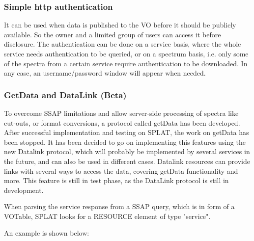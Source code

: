 \documentclass[final,authoryear,5p,times,twocolumn]{elsarticle}
\begin{document}
\subsubsection{Simple http authentication}

It can be used when data is published to the VO before it should be
publicly available. So the owner and a limited group of users can
access it before disclosure. The authentication can be done on a
service basis, where the whole service needs authentication to be
queried, or on a spectrum basis, i.e. only some of the spectra from a
certain service require authentication to be downloaded. In any case,
an username/password window will appear when needed.

\subsubsection{GetData and DataLink (Beta)}

To overcome SSAP limitations and allow server-side processing of
spectra like cut-outs, or format conversions, a protocol called
getData has been developed. After successful implementation and
testing on SPLAT, the work on getData has been stopped. It has been
decided to go on implementing this features using the new Datalink
protocol, which will probably be implemented by several services in
the future, and can also be used in different cases.  Datalink
resources can provide links with several ways to access the data,
covering getData functionality and more. This feature is still in test
phase, as the DataLink protocol is still in development.

When parsing the service response from a SSAP query, which is in form
of a VOTable, SPLAT looks for a RESOURCE element of type "service".

An example is shown below:
\end{document}
